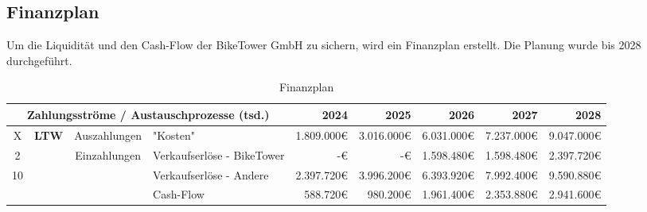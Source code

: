 \subsection{Finanzplan}

Um die Liquidität und den Cash-Flow der BikeTower GmbH zu sichern, wird ein Finanzplan erstellt. Die Planung wurde bis 2028 durchgeführt.

\begin{table}[H]
  \footnotesize
  \centering
  \begin{tabular}{ccclrrrrr}
    \toprule
    \multicolumn{4}{c}{\textbf{Zahlungsströme / Austauschprozesse} (tsd.)} & \textbf{2024}                 & \textbf{2025}                 & \textbf{2026}              & \textbf{2027} & \textbf{2028}                                        \\
    \midrule
    X                                                                      & \multirow{3}{*}{\textbf{LTW}} & Auszahlungen                  & "Kosten"                   & 1.809.000€    & 3.016.000€    & 6.031.000€ & 7.237.000€ & 9.047.000€ \\
    2                                                                      &                               & \multirow{2}{*}{Einzahlungen} & Verkaufserlöse - BikeTower & -€            & -€            & 1.598.480€ & 1.598.480€ & 2.397.720€ \\
    10                                                                     &                               &                               & Verkaufserlöse - Andere    & 2.397.720€    & 3.996.200€    & 6.393.920€ & 7.992.400€ & 9.590.880€ \\
    \midrule
                                                                           &                               &                               & Cash-Flow                  & 588.720€      & 980.200€      & 1.961.400€ & 2.353.880€ & 2.941.600€ \\

    \bottomrule
  \end{tabular}
  \caption{Finanzplan}
  \label{tab:finanzplan}
\end{table}